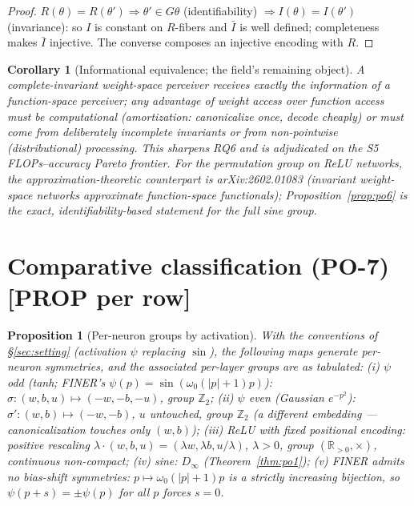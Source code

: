 \documentclass[11pt]{article}
\newtheorem{proposition}[theorem]{Proposition}
\newtheorem{corollary}[theorem]{Corollary}
\newcommand{\R}{\mathbb{R}}
\newcommand{\Z}{\mathbb{Z}}
\newcommand{\Dinf}{D_\infty}
\begin{document}
\begin{proof}
$R(\theta)=R(\theta')\Rightarrow\theta'\in G\theta$ (identifiability) $\Rightarrow
I(\theta)=I(\theta')$ (invariance): so $I$ is constant on $R$-fibers and $\bar I$ is well defined;
completeness makes $\bar I$ injective. The converse composes an injective encoding with $R$.
\end{proof}

\begin{corollary}[Informational equivalence; the field's remaining object]
A complete-invariant weight-space perceiver receives exactly the information of a function-space
perceiver; any advantage of weight access over function access must be \emph{computational}
(amortization: canonicalize once, decode cheaply) or must come from deliberately
\emph{incomplete} invariants or from non-pointwise (distributional) processing. This sharpens RQ6
and is adjudicated on the S5 FLOPs--accuracy Pareto frontier. For the permutation group on ReLU
networks, the approximation-theoretic counterpart is arXiv:2602.01083 (invariant weight-space
networks approximate function-space functionals); Proposition~\ref{prop:po6} is the exact,
identifiability-based statement for the full sine group.
\end{corollary}

\section{Comparative classification (PO-7) [PROP per row]}

\begin{proposition}[Per-neuron groups by activation]\label{prop:po7}
With the conventions of \S\ref{sec:setting} (activation $\psi$ replacing $\sin$), the following
maps generate per-neuron symmetries, and the associated per-layer groups are as tabulated:
(i) $\psi$ odd (tanh; FINER's $\psi(p)=\sin(\omega_0(|p|+1)p)$): $\sigma:(w,b,u)\mapsto(-w,-b,-u)$,
group $\Z_2$;
(ii) $\psi$ even (Gaussian $e^{-p^2}$): $\sigma':(w,b)\mapsto(-w,-b)$, $u$ untouched, group $\Z_2$
(a different embedding — canonicalization touches only $(w,b)$);
(iii) ReLU with fixed positional encoding: positive rescaling
$\lambda\cdot(w,b,u)=(\lambda w,\lambda b,u/\lambda)$, $\lambda>0$, group $(\R_{>0},\times)$,
continuous non-compact;
(iv) sine: $\Dinf$ (Theorem~\ref{thm:po1});
(v) FINER admits \emph{no} bias-shift symmetries: $p\mapsto\omega_0(|p|+1)p$ is a strictly
increasing bijection, so $\psi(p+s)=\pm\psi(p)$ for all $p$ forces $s=0$.
\end{proposition}
\end{document}
